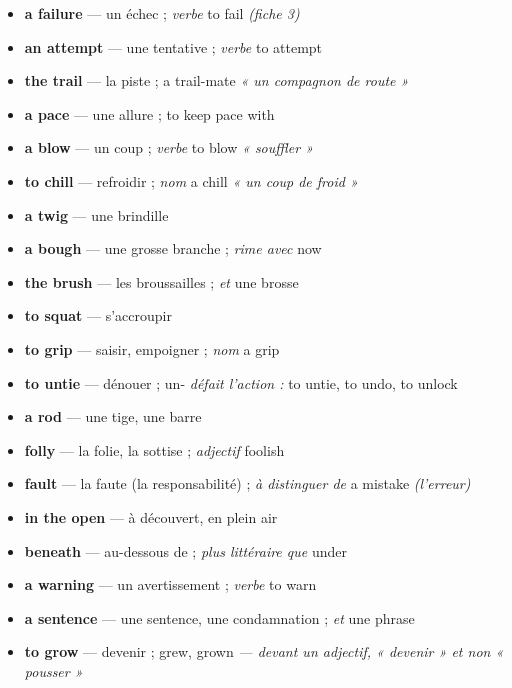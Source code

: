 \documentclass{fiche}
\begin{document}

\begin{itemize}[label=--,itemsep=0.8mm,leftmargin=*]\small
  \item \textbf{a failure} — un échec ; \textit{verbe} to fail \textit{(fiche 3)}
  \item \textbf{an attempt} — une tentative ; \textit{verbe} to attempt
  \item \textbf{the trail} — la piste ; a trail-mate \textit{« un compagnon de route »}
  \item \textbf{a pace} — une allure ; to keep pace with
  \item \textbf{a blow} — un coup ; \textit{verbe} to blow \textit{« souffler »}
  \item \textbf{to chill} — refroidir ; \textit{nom} a chill \textit{« un coup de froid »}
  \item \textbf{a twig} — une brindille
  \item \textbf{a bough} — une grosse branche ; \textit{rime avec} now
  \item \textbf{the brush} — les broussailles ; \textit{et} une brosse
  \item \textbf{to squat} — s'accroupir
  \item \textbf{to grip} — saisir, empoigner ; \textit{nom} a grip
  \item \textbf{to untie} — dénouer ; un- \textit{défait l'action :} to untie, to undo, to unlock
  \item \textbf{a rod} — une tige, une barre
  \item \textbf{folly} — la folie, la sottise ; \textit{adjectif} foolish
  \item \textbf{fault} — la faute (la responsabilité) ; \textit{à distinguer de} a mistake \textit{(l'erreur)}
  \item \textbf{in the open} — à découvert, en plein air
  \item \textbf{beneath} — au-dessous de ; \textit{plus littéraire que} under
  \item \textbf{a warning} — un avertissement ; \textit{verbe} to warn
  \item \textbf{a sentence} — une sentence, une condamnation ; \textit{et} une phrase
  \item \textbf{to grow} — devenir ; grew, grown \textit{— devant un adjectif, « devenir » et non « pousser »}
\end{itemize}
\end{document}
